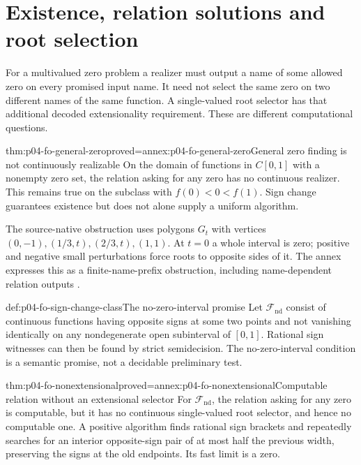 \section{Existence, relation solutions and root selection}
\label{sec:p04-fo-zeros}

For a multivalued zero problem a realizer must output a name
of some allowed zero on every promised input name.
It need not select the same zero on two different names
of the same function. A single-valued root selector has
that additional decoded extensionality requirement.
These are different computational questions.

\begin{hbtheorem}{thm:p04-fo-general-zero}{proved=annex:p04-fo-general-zero}{General zero finding is not continuously realizable}
On the domain of functions in \(C[0,1]\) with a nonempty
zero set, the relation asking for any zero has no continuous
realizer. This remains true on the subclass with
\(f(0)<0<f(1)\). Sign change guarantees existence but does
not alone supply a uniform algorithm.
\end{hbtheorem}

The source-native obstruction uses polygons \(G_t\) with
vertices \((0,-1),(1/3,t),(2/3,t),(1,1)\).
At \(t=0\) a whole interval is zero; positive and negative
small perturbations force roots to opposite sides of it.
The annex expresses this as a finite-name-prefix obstruction,
including name-dependent relation outputs
\cite[Theorem 7.2]{Weihrauch1995IntroductionRS}.

\begin{hbdefinition}{def:p04-fo-sign-change-class}{The no-zero-interval promise}
Let \(\mathcal F_{\mathrm{nd}}\) consist of continuous functions
having opposite signs at some two points and not vanishing
identically on any nondegenerate open subinterval of \([0,1]\).
Rational sign witnesses can then be found by strict
semidecision. The no-zero-interval condition is a semantic
promise, not a decidable preliminary test.
\end{hbdefinition}

\begin{hbtheorem}{thm:p04-fo-nonextensional}{proved=annex:p04-fo-nonextensional}{Computable relation without an extensional selector}
For \(\mathcal F_{\mathrm{nd}}\), the relation asking for
any zero is computable, but it has no continuous single-valued
root selector, and hence no computable one.
A positive algorithm finds rational sign brackets and
repeatedly searches for an interior opposite-sign pair of
at most half the previous width, preserving the signs at
the old endpoints. Its fast limit is a zero.
\end{hbtheorem}

